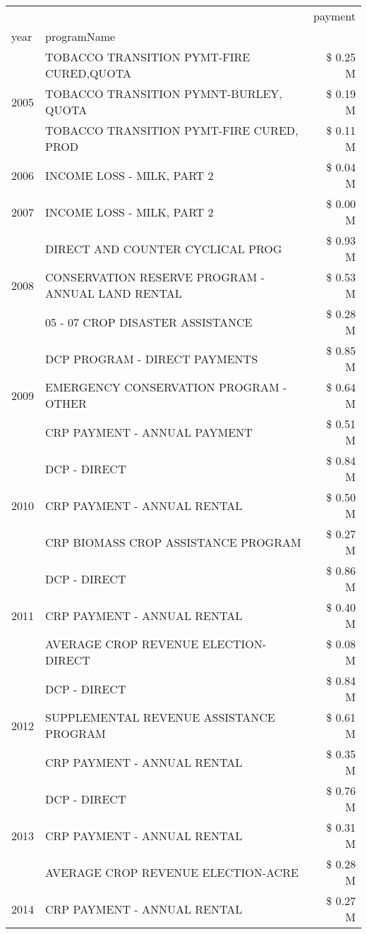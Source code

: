 \begin{tabular}{llr}
\toprule
 &  & payment \\
year & programName &  \\
\midrule
\multirow[t]{3}{*}{2005} & TOBACCO TRANSITION PYMT-FIRE CURED,QUOTA & \$ 0.25 M \\
 & TOBACCO TRANSITION PYMNT-BURLEY, QUOTA & \$ 0.19 M \\
 & TOBACCO TRANSITION PYMT-FIRE CURED, PROD & \$ 0.11 M \\
\cline{1-3}
2006 & INCOME LOSS - MILK, PART 2 & \$ 0.04 M \\
\cline{1-3}
2007 & INCOME LOSS - MILK, PART 2 & \$ 0.00 M \\
\cline{1-3}
\multirow[t]{3}{*}{2008} & DIRECT AND COUNTER CYCLICAL PROG & \$ 0.93 M \\
 & CONSERVATION RESERVE PROGRAM - ANNUAL LAND RENTAL & \$ 0.53 M \\
 & 05 - 07 CROP DISASTER ASSISTANCE & \$ 0.28 M \\
\cline{1-3}
\multirow[t]{3}{*}{2009} & DCP PROGRAM - DIRECT PAYMENTS & \$ 0.85 M \\
 & EMERGENCY CONSERVATION PROGRAM - OTHER & \$ 0.64 M \\
 & CRP PAYMENT - ANNUAL PAYMENT & \$ 0.51 M \\
\cline{1-3}
\multirow[t]{3}{*}{2010} & DCP - DIRECT & \$ 0.84 M \\
 & CRP PAYMENT - ANNUAL RENTAL & \$ 0.50 M \\
 & CRP BIOMASS CROP ASSISTANCE PROGRAM & \$ 0.27 M \\
\cline{1-3}
\multirow[t]{3}{*}{2011} & DCP - DIRECT & \$ 0.86 M \\
 & CRP PAYMENT - ANNUAL RENTAL & \$ 0.40 M \\
 & AVERAGE CROP REVENUE ELECTION-DIRECT & \$ 0.08 M \\
\cline{1-3}
\multirow[t]{3}{*}{2012} & DCP - DIRECT & \$ 0.84 M \\
 & SUPPLEMENTAL REVENUE ASSISTANCE PROGRAM & \$ 0.61 M \\
 & CRP PAYMENT - ANNUAL RENTAL & \$ 0.35 M \\
\cline{1-3}
\multirow[t]{3}{*}{2013} & DCP - DIRECT & \$ 0.76 M \\
 & CRP PAYMENT - ANNUAL RENTAL & \$ 0.31 M \\
 & AVERAGE CROP REVENUE ELECTION-ACRE & \$ 0.28 M \\
\cline{1-3}
\multirow[t]{3}{*}{2014} & CRP PAYMENT - ANNUAL RENTAL & \$ 0.27 M \\

\end{tabular}
